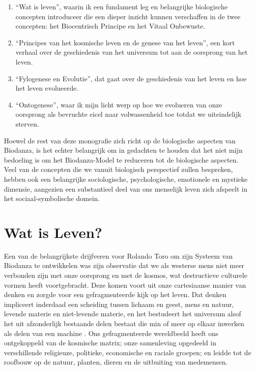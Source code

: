 \documentclass[
  11pt,
]{book}
\begin{document}
\begin{enumerate}
\def\labelenumi{\arabic{enumi}.}
\item
  ``Wat is leven'', waarin ik een fundament leg en belangrijke biologische concepten introduceer die een dieper inzicht kunnen verschaffen in de twee concepten: het Biocentrisch Principe en het Vitaal Onbewuste.
\item
  ``Principes van het kosmische leven en de genese van het leven'', een kort verhaal over de geschiedenis van het universum tot aan de oorsprong van het leven.
\item
  ``Fylogenese en Evolutie'', dat gaat over de geschiedenis van het leven en hoe het leven evolueerde.
\item
  ``Ontogenese'', waar ik mijn licht werp op hoe we evolueren van onze oorsprong als bevruchte eicel naar volwassenheid toe totdat we uiteindelijk sterven.
\end{enumerate}

Hoewel de rest van deze monografie zich richt op de biologische aspecten van Biodanza, is het echter belangrijk om in gedachten te houden dat het niet mijn bedoeling is om het Biodanza-Model te reduceren tot de biologische aspecten. Veel van de concepten die we vanuit biologisch perspectief zullen bespreken, hebben ook een belangrijke sociologische, psychologische, emotionele en mystieke dimensie, aangezien een substantieel deel van ons menselijk leven zich afspeelt in het sociaal-symbolische domein.

\chapter{Wat is Leven?}\label{wat-is-leven}

Een van de belangrijkste drijfveren voor Rolando Toro om zijn Systeem van Biodanza te ontwikkelen was zijn observatie dat we als westerse mens niet meer verbonden zijn met onze oorsprong en met de kosmos, wat destructieve culturele vormen heeft voortgebracht. Deze komen voort uit onze cartesiaanse manier van denken en zorgde voor een gefragmenteerde kijk op het leven. Dat denken impliceert inderdaad een scheiding tussen lichaam en geest, mens en natuur, levende materie en niet-levende materie, en het bestudeert het universum alsof het uit afzonderlijk bestaande delen bestaat die min of meer op elkaar inwerken als delen van een machine \citep{bohm1980}. Ons gefragmenteerde wereldbeeld heeft ons ontgekoppeld van de kosmische matrix; onze samenleving opgedeeld in verschillende religieuze, politieke, economische en raciale groepen; en leidde tot de roofbouw op de natuur, planten, dieren en de uitbuiting van medemensen.
\end{document}
